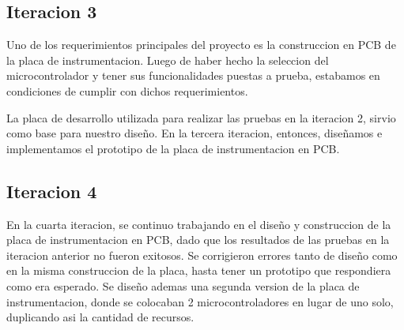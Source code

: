 \subsection{Iteracion 3} %
\label{sub:iteracion_3}

Uno de los requerimientos principales del proyecto es la construccion en PCB de la placa de instrumentacion. Luego de haber hecho la seleccion del microcontrolador y tener sus funcionalidades puestas a prueba, estabamos en condiciones de cumplir con dichos requerimientos.

La placa de desarrollo utilizada para realizar las pruebas en la iteracion 2, sirvio como base para nuestro diseño. En la tercera iteracion, entonces, diseñamos e implementamos el prototipo de la placa de instrumentacion en PCB.

\subsection{Iteracion 4} %
\label{sub:iteracion_4}

En la cuarta iteracion, se continuo trabajando en el diseño y construccion de la placa de instrumentacion en PCB, dado que los resultados de las pruebas en la iteracion anterior no fueron exitosos. Se corrigieron errores tanto de diseño como en la misma construccion de la placa, hasta tener un prototipo que respondiera como era esperado.
Se diseño ademas una segunda version de la placa de instrumentacion, donde se colocaban 2 microcontroladores en lugar de uno solo, duplicando asi la cantidad de recursos. 

